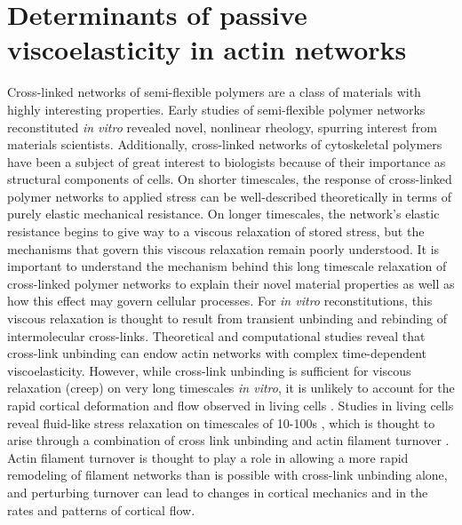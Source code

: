 \section{Determinants of passive viscoelasticity in actin networks}
Cross-linked networks of semi-flexible polymers are a class of materials with highly interesting properties. Early studies of semi-flexible polymer networks reconstituted {\em in vitro} revealed novel, nonlinear rheology, spurring interest from materials scientists\cite{megareview}.  Additionally, cross-linked networks of cytoskeletal polymers have been a subject of great interest to biologists because of their importance as structural components of cells\cite{cellmech_review1,cellmech_review2}.  On shorter timescales, the response of cross-linked polymer networks to applied stress can be well-described theoretically in terms of purely elastic mechanical resistance.  On longer timescales, the network's elastic resistance begins to give way to a viscous relaxation of stored stress, but the mechanisms that govern this viscous relaxation remain poorly understood.   It is important to understand the mechanism behind this long timescale relaxation of cross-linked polymer networks to explain their novel material properties as well as how this effect may govern cellular processes\cite{cell_rheo}.  For {\em in vitro} reconstitutions, this viscous relaxation is thought to result from transient unbinding and rebinding of intermolecular cross-links\cite{rheo_crosslinksmatter,theo_crosslinkslip1}. Theoretical \cite{theo_crosslinkslip1,theo_crosslinkslip2} and computational \cite{model_taeyoon,rheo_crosslinkslip2,theo_crosslinkslip3} studies reveal that cross-link unbinding can endow actin networks with complex time-dependent viscoelasticity. However, while cross-link unbinding is sufficient for viscous relaxation (creep) on very long timescales {\em in vitro}, it is unlikely to account for the rapid cortical deformation and flow observed in living cells \cite{rheo_crosslinksmatter, rheo_crosslinkslip1, rheo_crosslinkslip2, rheo_crosslinkslip3, rheo_nonaffine}.  Studies in living cells reveal fluid-like stress relaxation on timescales of 10-100s \cite{cellmech_flows, cellmech_flows2, cellmech_flows3, rheo_fluid, rheo_fluid2, cell_rheo_exp}, which is thought to arise through a combination of cross link unbinding and actin filament turnover \cite{De-La-Cruz:2015aa, De-La-Cruz:2009aa, Salbreux2012536}. Actin filament turnover is thought to play a role in allowing a more rapid remodeling of filament networks than is possible with cross-link unbinding alone\cite{Robin:2014aa}, and perturbing turnover can lead to changes in cortical mechanics and in the rates and patterns of cortical flow\cite{Van-Goor:2012aa, Fritzschee1501337}.    

